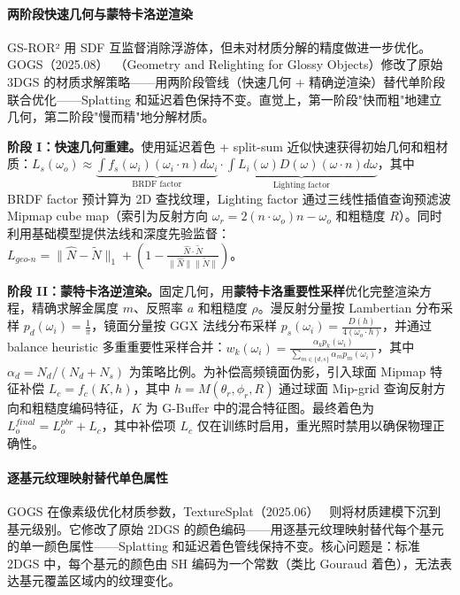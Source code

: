 \paragraph{两阶段快速几何与蒙特卡洛逆渲染}

GS-ROR² 用 SDF 互监督消除浮游体，但未对材质分解的精度做进一步优化。GOGS（2025.08）~\cite{2508_14563}（Geometry and Relighting for Glossy Objects）修改了原始 3DGS 的材质求解策略——用两阶段管线（快速几何 + 精确逆渲染）替代单阶段联合优化——Splatting 和延迟着色保持不变。直觉上，第一阶段"快而粗"地建立几何，第二阶段"慢而精"地分解材质。

\textbf{阶段 I：快速几何重建。}使用延迟着色 + split-sum 近似快速获得初始几何和粗材质：$L_s(\omega_o) \approx \underbrace{\int f_s(\omega_i) (\omega_i \cdot n) d\omega_i}_{\text{BRDF factor}} \cdot \underbrace{\int L_i(\omega) D(\omega)(\omega \cdot n) d\omega}_{\text{Lighting factor}}$，其中 BRDF factor 预计算为 2D 查找纹理，Lighting factor 通过三线性插值查询预滤波 Mipmap cube map（索引为反射方向 $\omega_r = 2(n \cdot \omega_o)n - \omega_o$ 和粗糙度 $R$）。同时利用基础模型提供法线和深度先验监督：$L_{geo\text{-}n} = \|\hat{N} - \tilde{N}\|_1 + (1 - \frac{\hat{N} \cdot \tilde{N}}{\|\hat{N}\| \|\tilde{N}\|})$。

\textbf{阶段 II：蒙特卡洛逆渲染。}固定几何，用\textbf{蒙特卡洛重要性采样}优化完整渲染方程，精确求解金属度 $m$、反照率 $a$ 和粗糙度 $\rho$。漫反射分量按 Lambertian 分布采样 $p_d(\omega_i) = \frac{1}{\pi}$，镜面分量按 GGX 法线分布采样 $p_s(\omega_i) = \frac{D(h)}{4(\omega_o \cdot h)}$，并通过 balance heuristic 多重重要性采样合并：$w_k(\omega_i) = \frac{\alpha_k p_k(\omega_i)}{\sum_{m \in \{d,s\}} \alpha_m p_m(\omega_i)}$，其中 $\alpha_d = N_d / (N_d + N_s)$ 为策略比例。为补偿高频镜面伪影，引入球面 Mipmap 特征补偿 $L_c = f_c(K, h)$，其中 $h = M(\theta_r, \phi_r, R)$ 通过球面 Mip-grid 查询反射方向和粗糙度编码特征，$K$ 为 G-Buffer 中的混合特征图。最终着色为 $L_o^{final} = L_o^{pbr} + L_c$，其中补偿项 $L_c$ 仅在训练时启用，重光照时禁用以确保物理正确性。

\paragraph{逐基元纹理映射替代单色属性}

GOGS 在像素级优化材质参数，TextureSplat（2025.06）~\cite{2506_13348} 则将材质建模下沉到基元级别。它修改了原始 2DGS 的颜色编码——用逐基元纹理映射替代每个基元的单一颜色属性——Splatting 和延迟着色管线保持不变。核心问题是：标准 2DGS 中，每个基元的颜色由 SH 编码为一个常数（类比 Gouraud 着色），无法表达基元覆盖区域内的纹理变化。

